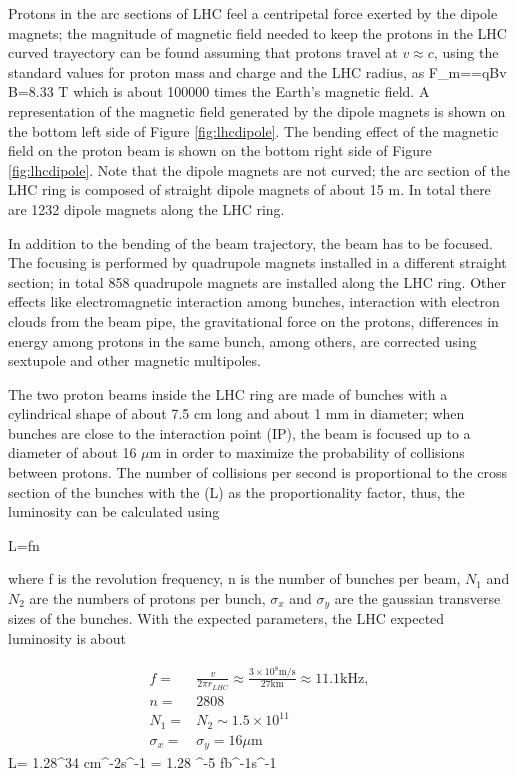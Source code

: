 Protons in the arc sections of LHC feel a centripetal force exerted by the dipole magnets; the magnitude of magnetic field needed to keep the protons in the LHC curved trayectory can be found assuming that protons travel at $v \approx c$, using the standard values for proton mass and charge and the LHC radius, as
\beqn
F_m==qBv \quad \to B=8.33 T
\eeqn
\noindent which is about 100000 times the Earth's magnetic field. A representation of the magnetic field generated by the dipole magnets is shown on the bottom left side of Figure \ref{fig:lhcdipole}. The bending effect of the magnetic field on the proton beam is shown on the bottom right side of Figure \ref{fig:lhcdipole}. Note that the dipole magnets are not curved; the arc section of the LHC ring is composed of straight dipole magnets of about 15 m. In total there are 1232 dipole magnets along the LHC ring.

In addition to the bending of the beam trajectory, the beam has to be focused. The focusing is performed by quadrupole magnets installed in a different straight section; in total 858 quadrupole magnets are installed along the LHC ring. Other effects like electromagnetic interaction among bunches, interaction with electron clouds from the beam pipe, the gravitational force on the protons, differences in energy among protons in the same bunch, among others, are corrected using sextupole and other magnetic multipoles.

The two proton beams inside the LHC ring are made of bunches with a cylindrical shape of about 7.5 cm long and about 1 mm in diameter; when bunches are close to the interaction point (IP), the beam is focused up to a diameter of about 16 $\mu$m in order to maximize the probability of collisions between protons. The number of collisions per second is proportional to the cross section of the bunches with the  (L) as the proportionality factor, thus, the luminosity can be calculated using

\beqn
L=fn\label{eq:lumi}
\eeqn

\noindent where f is the revolution frequency, n is the number of bunches per beam, $N_1$ and $N_2$ are the numbers of protons per bunch, $\sigma_x$ and $\sigma_y$ are the gaussian transverse sizes of the bunches. With the expected parameters, the LHC expected luminosity is about  

\begin{align}
  f=&\frac{v}{2\pi r_{LHC}}\approx\frac{3\times10^8\textrm{m/s}}{27\textrm{km}}\approx 11.1 \textrm{kHz},\nonumber \\
  n=&2808\nonumber \\ 
  N_1=&N_2 \sim1.5\times 10^{11}\nonumber\\
  \sigma_x=&\sigma_y=16\mu \textrm{m}\nonumber
\end{align}
\beqn
L= 1.28^{34} \textrm{cm}^{-2}\textrm{s}^{-1} = 1.28 ^{-5} \textrm{fb}^{-1}\textrm{s}^{-1}
\eeqn


